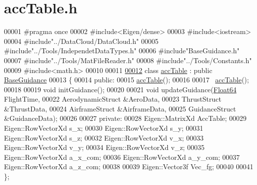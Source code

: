 \hypertarget{acc_table_8h_source}{}\section{acc\+Table.\+h}
\label{acc_table_8h_source}

\begin{DoxyCode}
00001 \textcolor{preprocessor}{#pragma once}
00002 \textcolor{preprocessor}{#include<Eigen/dense>}
00003 \textcolor{preprocessor}{#include<iostream>}
00004 \textcolor{preprocessor}{#include"../DataCloud/DataCloud.h"}
00005 \textcolor{preprocessor}{#include"../Tools/IndependetDataTypes.h"}
00006 \textcolor{preprocessor}{#include"BaseGuidance.h"}
00007 \textcolor{preprocessor}{#include"../Tools/MatFileReader.h"}
00008 \textcolor{preprocessor}{#include"../Tools/Constants.h"}
00009 \textcolor{preprocessor}{#include<math.h>}
00010 
00011 
\hyperlink{classacc_table}{00012} \textcolor{keyword}{class }\hyperlink{classacc_table}{accTable} : \textcolor{keyword}{public} \hyperlink{class_base_guidance}{BaseGuidance}
00013 \{
00014 \textcolor{keyword}{public}:
00015     \hyperlink{classacc_table}{accTable}();
00016 
00017     ~\hyperlink{classacc_table}{accTable}();
00018 
00019     \textcolor{keywordtype}{void} initGuidance();
00020 
00021     \textcolor{keywordtype}{void} updateGuidance(\hyperlink{group___tools_ga3f1431cb9f76da10f59246d1d743dc2c}{Float64} FlightTime,
00022                       AerodynamicStruct &AeroData,
00023                       ThrustStruct &ThrustData,
00024                       AirframeStruct &AirframeData,
00025                       GuidanceStruct &GuidanceData);
00026 
00027 \textcolor{keyword}{private}:
00028     Eigen::MatrixXd AccTable;
00029     Eigen::RowVectorXd s\_x;
00030     Eigen::RowVectorXd s\_y;
00031     Eigen::RowVectorXd s\_z;
00032     Eigen::RowVectorXd v\_x;
00033     Eigen::RowVectorXd v\_y;
00034     Eigen::RowVectorXd v\_z;
00035     Eigen::RowVectorXd a\_x\_com;
00036     Eigen::RowVectorXd a\_y\_com;
00037     Eigen::RowVectorXd a\_z\_com;
00038 
00039     Eigen::Vector3f Vec\_fg;
00040 
00041 \};
\end{DoxyCode}

